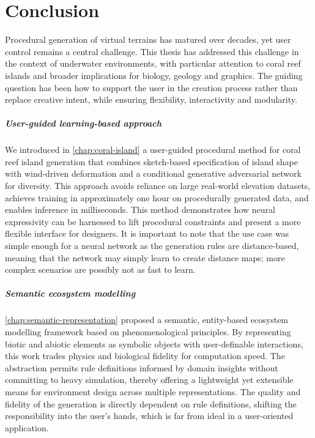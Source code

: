 \chapter{Conclusion}


Procedural generation of virtual terrains has matured over decades, yet user control remains a central challenge. This thesis has addressed this challenge in the context of underwater environments, with particular attention to coral reef islands and broader implications for biology, geology and graphics. The guiding question has been how to support the user in the creation process rather than replace creative intent, while ensuring flexibility, interactivity and modularity.

\paragraph{User-guided learning-based approach} We introduced in \cref{chap:coral-island} a user-guided procedural method for coral reef island generation that combines sketch-based specification of island shape with wind-driven deformation and a conditional generative adversarial network for diversity. This approach avoids reliance on large real-world elevation datasets, achieves training in approximately one hour on procedurally generated data, and enables inference in milliseconds. This method demonstrates how neural expressivity can be harnessed to lift procedural constraints and present a more flexible interface for designers. It is important to note that the use case was simple enough for a neural network as the generation rules are distance-based, meaning that the network may simply learn to create distance maps; more complex scenarios are possibly not as fast to learn.

\paragraph{Semantic ecosystem modelling} \cref{chap:semantic-representation} proposed a semantic, entity-based ecosystem modelling framework based on phenomenological principles. By representing biotic and abiotic elements as symbolic objects with user-definable interactions, this work trades physics and biological fidelity for computation speed. The abstraction permits rule definitions informed by domain insights without committing to heavy simulation, thereby offering a lightweight yet extensible means for environment design across multiple representations. The quality and fidelity of the generation is directly dependent on rule definitions, shifting the responsibility into the user's hands, which is far from ideal in a user-oriented application.

